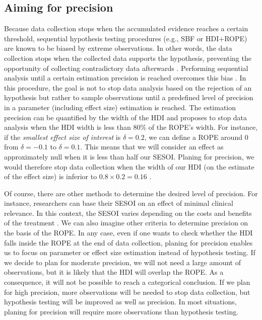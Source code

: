 \documentclass[a4paper,jou,natbib,floatsintext,donotrepeattitle]{apa6}
\begin{document}
\subsection{Aiming for precision}

Because data collection stops when the accumulated evidence reaches a certain threshold, sequential hypothesis testing procedures (e.g., SBF or HDI+ROPE) are known to be biased by extreme observations. In other words, the data collection stops when the collected data supports the hypothesis, preventing the opportunity of collecting contradictory data afterwards \citep{kruschke_doing_2015}. Performing sequential analysis until a certain estimation precision is reached overcomes this bias \citep{kruschke_doing_2015}. In this procedure, the goal is not to stop data analysis based on the rejection of an hypothesis but rather to sample observations until a predefined level of precision in a parameter (including effect size) estimation is reached. The estimation precision can be quantified by the width of the HDI and \cite{kruschke_doing_2015} proposes to stop data analysis when the HDI width is less than 80\% of the ROPE's width. For instance, if the \textit{smallest effect size of interest} \citep[SESOI,][]{lakens_equivalence_2018} is $\delta = 0.2$, we can define a ROPE around 0 from $\delta = -0.1$ to $\delta = 0.1$. This means that we will consider an effect as approximately null when it is less than half our SESOI. Planing for precision, we would therefore stop data collection when the width of our HDI (on the estimate of the effect size) is inferior to $0.8 \times 0.2 = 0.16$ \citep{kruschke_rejecting_2018}. \par

Of course, there are other methods to determine the desired level of precision. For instance, researchers can base their SESOI on an effect of minimal clinical relevance. In this context, the SESOI varies depending on the costs and benefits of the treatment \citep{lakens_equivalence_2018}. We can also imagine other criteria to determine precision on the basis of the ROPE. In any case, even if one wants to check whether the HDI falls inside the ROPE at the end of data collection, planing for precision enables us to focus on parameter or effect size estimation instead of hypothesis testing. If we decide to plan for moderate precision, we will not need a large amount of observations, but it is likely that the HDI will overlap the ROPE. As a consequence, it will not be possible to reach a categorical conclusion. If we plan for high precision, more observations will be needed to stop data collection, but hypothesis testing will be improved as well as precision. In most situations, planing for precision will require more observations than hypothesis testing. \par
\end{document}
